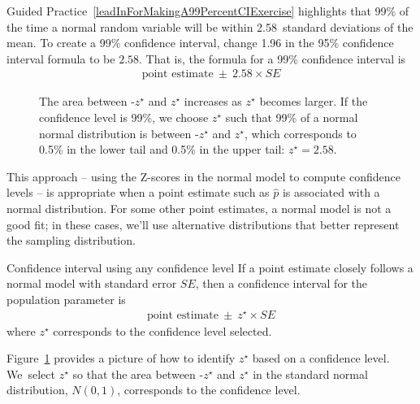 Guided Practice~\ref{leadInForMakingA99PercentCIExercise} highlights
that 99\% of the time a normal random variable will be within
2.58~standard deviations of the mean.
To create a 99\% confidence interval, change 1.96 in the 95\%
confidence interval formula to be $2.58$.
That is, the formula
for a 99\% confidence interval is
\begin{align*}
\text{point estimate}\ \pm\ 2.58 \times SE
\end{align*}

\begin{figure}
  \centering
  \caption{The area between -$z^{\star}$ and $z^{\star}$ increases as
      $z^{\star}$ becomes larger. If the confidence level is 99\%,
      we choose $z^{\star}$ such that 99\% of a normal
      normal distribution is between -$z^{\star}$ and $z^{\star}$,
      which corresponds to 0.5\%
      in the lower tail and 0.5\% in the upper tail:
      $z^{\star}=2.58$.}
\label{choosingZForCI}
\end{figure}

This approach -- using the Z-scores in the
normal model to compute confidence levels --
is appropriate when a point estimate such as $\hat{p}$
is associated with a normal distribution.
For some other point estimates, a normal model is not a good fit;
in these cases, we'll use alternative distributions that better
represent the sampling distribution.

\begin{onebox}{Confidence interval using any confidence level}
  If a point estimate closely follows a normal model
  with standard error $SE$, then a confidence interval
  for the population parameter is
  \begin{align*}
  \text{point estimate}\ \pm\ z^{\star} \times SE
  \end{align*}
  where $z^{\star}$ corresponds to the confidence
  level selected.
\end{onebox}

Figure~\ref{choosingZForCI} provides a picture of how to identify
$z^{\star}$ based on a confidence level. We~select $z^{\star}$
so that the area between -$z^{\star}$ and $z^{\star}$ in the
standard normal distribution,
$N(0, 1)$, corresponds to the confidence level.

